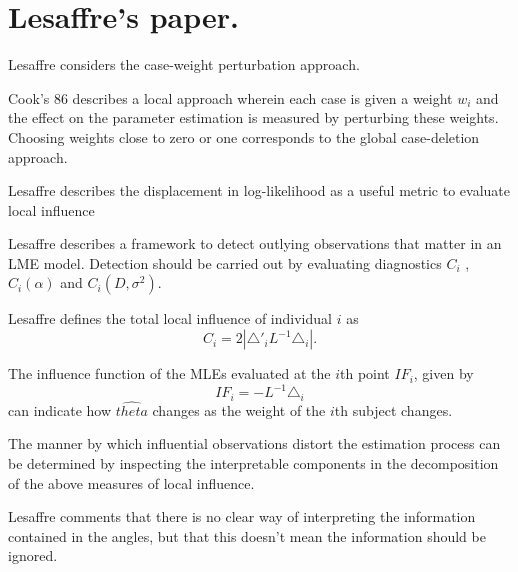 \documentclass[12pt, a4paper]{report}
\theoremstyle{plain}
\theoremstyle{definition}
\theoremstyle{remark}
\begin{document}
\section{Lesaffre's paper.} %


Lesaffre considers the case-weight perturbation approach.




Cook's 86 describes a local approach wherein each case is given a weight $w_{i}$ and the effect on the parameter estimation is measured by perturbing these weights. Choosing weights close to zero or one corresponds to the global case-deletion approach.


Lesaffre  describes the displacement in log-likelihood as a useful metric to evaluate local influence %




Lesaffre describes a framework to detect outlying observations that matter in an LME model. Detection should be carried out by evaluating diagnostics $C_{i}$ , $C_{i}(\alpha)$ and $C_{i}(D,\sigma^2)$.




Lesaffre defines the total local influence of individual $i$ as
\begin{equation}
C_{i} = 2 | \triangle \prime _{i} L^{-1} \triangle_{i}|.
\end{equation}




The influence function of the MLEs evaluated at the $i$th point $IF_{i}$, given by
\begin{equation}
IF_{i} = -L^{-1}\triangle _{i}
\end{equation}
can indicate how $\hat{theta}$ changes as the weight of the $i$th
subject changes.


The manner by which influential observations distort the estimation process can be determined by inspecting the
interpretable components in the decomposition of the above measures of local influence.




Lesaffre comments that there is no clear way of interpreting the information contained in the angles, but that this doesn't mean the information should be ignored.






\printindex


\end{document}
